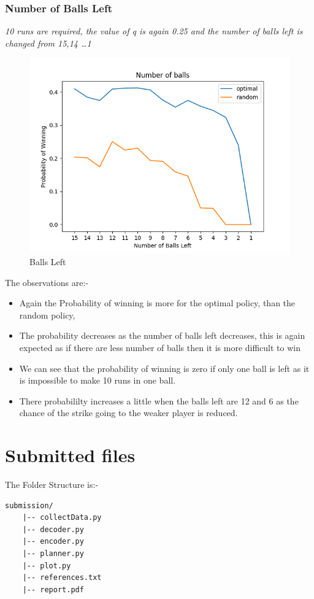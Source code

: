 \documentclass[10pt]{article}
\begin{document}
\begin{minipage}{0.9\textwidth}
    \subsubsection{Number of Balls Left}
    \textit{10 runs are required, the value of q is again 0.25 and the number of balls left is changed from 15,14 \dots 1}
    \begin{figure}[H]
    \centering
    \includegraphics[scale = 0.9]{../Figure_3.png}
    \caption{Balls Left}
\end{figure}
\end{minipage}

The observations are:-
\begin{itemize}
    \item Again the Probability of winning is more for the optimal policy, than the random policy,
    \item The probability decreases as the number of balls left decreases, this is again expected as if there are less number of balls then it is more difficult to win
    \item We can see that the probability of winning is zero if only one ball is left as it is impossible to make 10 runs in one ball.
    \item There probabililty increases a little when the balls left are 12 and 6 as the chance of the strike going to the weaker player is reduced.
\end{itemize}

\section{Submitted files}
The Folder Structure is:-
\begin{verbatim}
submission/
    |-- collectData.py
    |-- decoder.py
    |-- encoder.py
    |-- planner.py
    |-- plot.py
    |-- references.txt
    |-- report.pdf
\end{verbatim}
\end{document}
